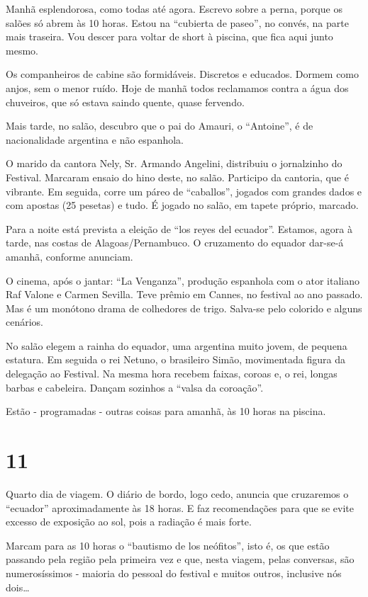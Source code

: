 Manhã esplendorosa, como todas até agora. Escrevo sobre a perna, porque os salões só abrem às 10 horas. Estou na “cubierta de paseo”, no convés, na parte mais traseira. Vou descer para voltar de short à piscina, que fica aqui junto mesmo.

Os companheiros de cabine são formidáveis. Discretos e educados. Dormem como anjos, sem o menor ruído. Hoje de manhã todos reclamamos contra a água dos chuveiros, que só estava saindo quente, quase fervendo.

Mais tarde, no salão, descubro que o pai do Amauri, o “Antoine”, é de nacionalidade argentina e não espanhola.

O marido da cantora Nely, Sr. Armando Angelini, distribuiu o jornalzinho do Festival. Marcaram ensaio do hino deste, no salão. Participo da cantoria, que é vibrante. Em seguida, corre um páreo de “caballos”, jogados com grandes dados e com apostas (25 pesetas) e tudo. É jogado no salão, em tapete próprio, marcado.

Para a noite está prevista a eleição de “los reyes del ecuador”. Estamos, agora à tarde, nas costas de Alagoas/Pernambuco. O cruzamento do equador dar-se-á amanhã, conforme anunciam.

O cinema, após o jantar: “La Venganza”, produção espanhola com o ator italiano Raf Valone e Carmen Sevilla. Teve prêmio em Cannes, no festival ao ano passado. Mas é um monótono drama de colhedores de trigo. Salva-se pelo colorido e alguns cenários.

No salão elegem a rainha do equador, uma argentina muito jovem, de pequena estatura. Em seguida o rei Netuno, o brasileiro Simão, movimentada figura da delegação ao Festival. Na mesma hora recebem faixas, coroas e, o rei, longas barbas e cabeleira. Dançam sozinhos a “valsa da coroação”.

Estão - programadas - outras coisas para amanhã, às 10 horas na piscina.

\section*{11 \adfflatleafright {}}

Quarto dia de viagem. O diário de bordo, logo cedo, anuncia que cruzaremos o “ecuador” aproximadamente às 18 horas. E faz recomendações para que se evite excesso de exposição ao sol, pois a radiação é mais forte.

Marcam para as 10 horas o “bautismo de los neófitos”, isto é, os que estão passando pela região pela primeira vez e que, nesta viagem, pelas conversas, são numerosíssimos - maioria do pessoal do festival e muitos outros, inclusive nós dois\ldots

